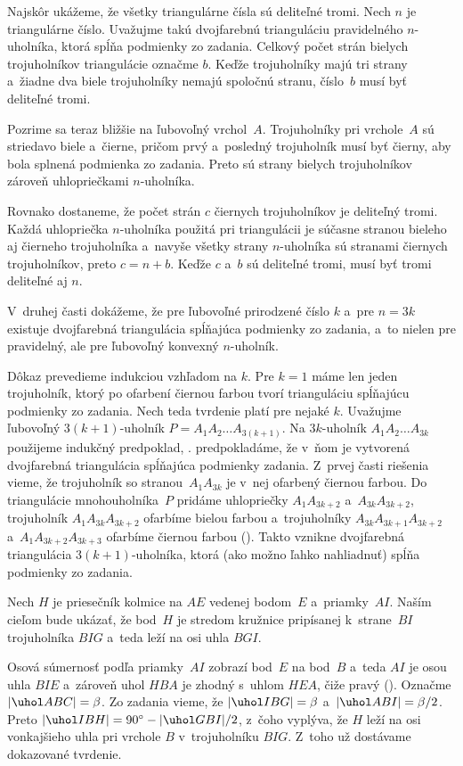 {%
Najskôr ukážeme, že všetky triangulárne čísla sú deliteľné tromi. Nech $n$ je triangulárne číslo. Uvažujme takú dvojfarebnú trianguláciu pravidelného $n$-uholníka, ktorá spĺňa podmienky zo zadania. Celkový počet strán bielych trojuholníkov triangulácie označme $b$. Keďže trojuholníky majú tri strany a~žiadne dva biele trojuholníky nemajú spoločnú stranu, číslo~$b$ musí byť deliteľné tromi.

Pozrime sa teraz bližšie na ľubovoľný vrchol~$A$. Trojuholníky pri vrchole~$A$ sú striedavo biele a~čierne, pričom prvý a~posledný trojuholník musí byť čierny, aby bola splnená podmienka zo zadania. Preto sú strany bielych trojuholníkov zároveň uhlopriečkami $n$-uholníka.

Rovnako dostaneme, že počet strán $c$ čiernych trojuholníkov je deliteľný tromi. Každá uhlopriečka $n$-uholníka použitá pri triangulácii je súčasne stranou bieleho aj čierneho trojuholníka a~navyše všetky strany $n$-uholníka sú stranami čiernych trojuholníkov, preto $c = n + b$. Keďže $c$ a~$b$ sú deliteľné tromi, musí byť tromi deliteľné aj $n$.

\smallskip
V~druhej časti dokážeme, že pre ľubovoľné prirodzené číslo $k$ a~pre $n=3k$ existuje dvojfarebná triangulácia spĺňajúca podmienky zo zadania, a~to nielen pre pravidelný, ale pre ľubovoľný konvexný $n$-uholník.
%

Dôkaz prevedieme indukciou vzhľadom na $k$. Pre $k=1$ máme len jeden trojuholník, ktorý po ofarbení čiernou farbou tvorí trianguláciu spĺňajúcu podmienky zo zadania. Nech teda tvrdenie platí pre nejaké $k$. Uvažujme ľubovoľný $3(k+1)$-uholník $P = A_1A_2\dots A_{3(k+1)}$. Na $3k$-uholník $A_1A_2\dots A_{3k}$ použijeme indukčný predpoklad, \tj. predpokladáme, že v~ňom je vytvorená dvojfarebná triangulácia spĺňajúca podmienky zadania. Z~prvej časti riešenia vieme, že trojuholník so stranou~$A_1A_{3k}$ je v~nej ofarbený čiernou farbou. Do triangulácie mnohouholníka~$P$ pridáme uhlopriečky $A_1A_{3k+2}$ a~$A_{3k}A_{3k+2}$, trojuholník $A_1A_{3k}A_{3k+2}$ ofarbíme bielou farbou a~trojuholníky $A_{3k}A_{3k+1}A_{3k+2}$ a~$A_1A_{3k+2}A_{3k+3}$ ofarbíme čiernou farbou (\obr). Takto vznikne dvojfarebná triangulácia $3(k+1)$-uholníka, ktorá (ako možno ľahko nahliadnuť) spĺňa podmienky zo zadania.}

{%
Nech $H$ je priesečník kolmice na $AE$ vedenej bodom~$E$ a~priamky~$AI$. Naším cieľom bude ukázať, že bod~$H$ je stredom kružnice pripísanej k~strane~$BI$ trojuholníka $BIG$ a~teda leží na osi uhla $BGI$.
%

Osová súmernosť podľa priamky~$AI$ zobrazí bod~$E$ na bod~$B$ a~teda $AI$ je osou uhla $BIE$ a~zároveň uhol $HBA$ je zhodný s~uhlom $HEA$, čiže pravý (\obr). Označme $|\uhol ABC|=\beta$. Zo zadania vieme, že $|\uhol IBG| = \beta$ a~$|\uhol ABI| = \beta/2$. Preto $|\uhol IBH| = 90^\circ-|\uhol GBI|/2$, z~čoho vyplýva, že $H$ leží na osi vonkajšieho uhla pri vrchole $B$ v~trojuholníku $BIG$. Z~toho už dostávame dokazované tvrdenie.}

